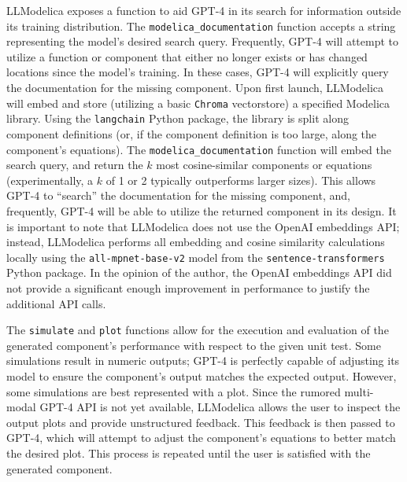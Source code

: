 \documentclass[11pt]{article}
\begin{document}
LLModelica exposes a function to aid GPT-4 in its search for information outside its training distribution. The \texttt{modelica\_documentation} function accepts a string representing the model's desired search query. Frequently, GPT-4 will attempt to utilize a function or component that either no longer exists or has changed locations since the model's training. In these cases, GPT-4 will explicitly query the documentation for the missing component. Upon first launch, LLModelica will embed and store (utilizing a basic \texttt{Chroma} vectorstore) a specified Modelica library. Using the \texttt{langchain} Python package, the library is split along component definitions (or, if the component definition is too large, along the component's equations). The \texttt{modelica\_documentation} function will embed the search query, and return the \(k\) most cosine-similar components or equations (experimentally, a \(k\) of 1 or 2 typically outperforms larger sizes). This allows GPT-4 to ``search'' the documentation for the missing component, and, frequently, GPT-4 will be able to utilize the returned component in its design. It is important to note that LLModelica does not use the OpenAI embeddings API; instead, LLModelica performs all embedding and cosine similarity calculations locally using the \texttt{all-mpnet-base-v2} model from the \texttt{sentence-transformers} Python package. In the opinion of the author, the OpenAI embeddings API did not provide a significant enough improvement in performance to justify the additional API calls.

The \texttt{simulate} and \texttt{plot} functions allow for the execution and evaluation of the generated component's performance with respect to the given unit test. Some simulations result in numeric outputs; GPT-4 is perfectly capable of adjusting its model to ensure the component's output matches the expected output. However, some simulations are best represented with a plot. Since the rumored multi-modal GPT-4 API is not yet available, LLModelica allows the user to inspect the output plots and provide unstructured feedback. This feedback is then passed to GPT-4, which will attempt to adjust the component's equations to better match the desired plot. This process is repeated until the user is satisfied with the generated component.
\end{document}

